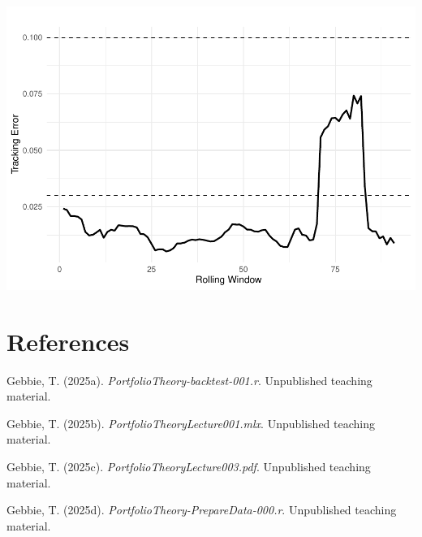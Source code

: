 \documentclass[
  12pt,
]{article}
\newlength{\cslhangindent}
\newenvironment{CSLReferences}[2] %
 {\begin{list}{}{%
  \setlength{\itemindent}{0pt}
  \setlength{\leftmargin}{0pt}
  \setlength{\parsep}{0pt}
  \ifodd #1
   \setlength{\leftmargin}{\cslhangindent}
   \setlength{\itemindent}{-1\cslhangindent}
  \fi
  \setlength{\itemsep}{#2\baselineskip}}}
 {\end{list}}
\begin{document}
\includegraphics{NDXNES005_A2_RMD_files/figure-latex/unnamed-chunk-12-1.pdf}

\newpage

\section*{References}\label{references}

\label{refs}
\begin{CSLReferences}{1}{0}
Gebbie, T. (2025a). \emph{PortfolioTheory-backtest-001.r}. Unpublished
teaching material.

Gebbie, T. (2025b). \emph{PortfolioTheoryLecture001.mlx}. Unpublished
teaching material.

Gebbie, T. (2025c). \emph{PortfolioTheoryLecture003.pdf}. Unpublished
teaching material.

Gebbie, T. (2025d). \emph{PortfolioTheory-PrepareData-000.r}.
Unpublished teaching material.

\end{CSLReferences}
\end{document}
